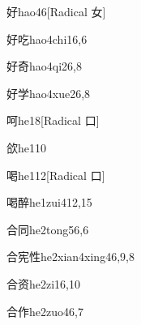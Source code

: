 \begin{verbete}{好}{hao4}{6}[Radical ⼥]
\end{verbete}

\begin{verbete}{好吃}{hao4chi1}{6,6}
\end{verbete}

\begin{verbete}{好奇}{hao4qi2}{6,8}
\end{verbete}

\begin{verbete}{好学}{hao4xue2}{6,8}
\end{verbete}

\begin{verbete}{呵}{he1}{8}[Radical 口]
\end{verbete}

\begin{verbete}{欱}{he1}{10}
\end{verbete}

\begin{verbete}{喝}{he1}{12}[Radical 口]
\end{verbete}

\begin{verbete}{喝醉}{he1zui4}{12,15}
\end{verbete}

\begin{verbete}{合同}{he2tong5}{6,6}
\end{verbete}

\begin{verbete}{合宪性}{he2xian4xing4}{6,9,8}
\end{verbete}

\begin{verbete}{合资}{he2zi1}{6,10}
\end{verbete}

\begin{verbete}{合作}{he2zuo4}{6,7}
\end{verbete}

